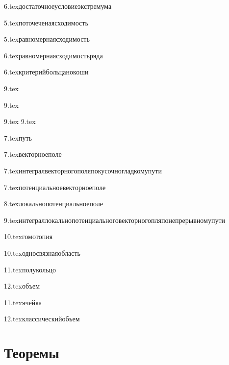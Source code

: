 {6.tex}{достаточноеусловиеэкстремума}

{5.tex}{поточеченаясходимость}

{5.tex}{равномернаясходимость}

{6.tex}{равномернаясходимостьряда}

{6.tex}{критерийбольцанокоши}

{9.tex}{}


{9.tex}{}
\?

{9.tex}{}\?
{9.tex}{}\?

{7.tex}{путь}

{7.tex}{векторноеполе}

{7.tex}{интегралвекторногополяпокусочногладкомупути}

{7.tex}{потенциальноевекторноеполе}

{8.tex}{локальнопотенциальноеполе}

{9.tex}{интеграллокальнопотенциальноговекторногопляпонепрерывномупути}

{10.tex}{гомотопия}

{10.tex}{односвязнаяобласть}

{11.tex}{полукольцо}

{12.tex}{объем}

{11.tex}{ячейка}

{12.tex}{классическийобъем}


\section{Теоремы}

